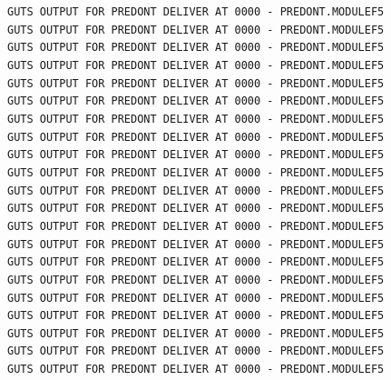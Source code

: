 \texttt{GUTS OUTPUT FOR PREDONT DELIVER AT 0000 - PREDONT.MODULEF5}\\
\texttt{GUTS OUTPUT FOR PREDONT DELIVER AT 0000 - PREDONT.MODULEF5}\\
\texttt{GUTS OUTPUT FOR PREDONT DELIVER AT 0000 - PREDONT.MODULEF5}\\
\texttt{GUTS OUTPUT FOR PREDONT DELIVER AT 0000 - PREDONT.MODULEF5}\\
\texttt{GUTS OUTPUT FOR PREDONT DELIVER AT 0000 - PREDONT.MODULEF5}\\
\texttt{GUTS OUTPUT FOR PREDONT DELIVER AT 0000 - PREDONT.MODULEF5}\\
\texttt{GUTS OUTPUT FOR PREDONT DELIVER AT 0000 - PREDONT.MODULEF5}\\
\texttt{GUTS OUTPUT FOR PREDONT DELIVER AT 0000 - PREDONT.MODULEF5}\\
\texttt{GUTS OUTPUT FOR PREDONT DELIVER AT 0000 - PREDONT.MODULEF5}\\
\texttt{GUTS OUTPUT FOR PREDONT DELIVER AT 0000 - PREDONT.MODULEF5}\\
\texttt{GUTS OUTPUT FOR PREDONT DELIVER AT 0000 - PREDONT.MODULEF5}\\
\texttt{GUTS OUTPUT FOR PREDONT DELIVER AT 0000 - PREDONT.MODULEF5}\\
\texttt{GUTS OUTPUT FOR PREDONT DELIVER AT 0000 - PREDONT.MODULEF5}\\
\texttt{GUTS OUTPUT FOR PREDONT DELIVER AT 0000 - PREDONT.MODULEF5}\\
\texttt{GUTS OUTPUT FOR PREDONT DELIVER AT 0000 - PREDONT.MODULEF5}\\
\texttt{GUTS OUTPUT FOR PREDONT DELIVER AT 0000 - PREDONT.MODULEF5}\\
\texttt{GUTS OUTPUT FOR PREDONT DELIVER AT 0000 - PREDONT.MODULEF5}\\
\texttt{GUTS OUTPUT FOR PREDONT DELIVER AT 0000 - PREDONT.MODULEF5}\\
\texttt{GUTS OUTPUT FOR PREDONT DELIVER AT 0000 - PREDONT.MODULEF5}\\
\texttt{GUTS OUTPUT FOR PREDONT DELIVER AT 0000 - PREDONT.MODULEF5}\\
\texttt{GUTS OUTPUT FOR PREDONT DELIVER AT 0000 - PREDONT.MODULEF5}\\

